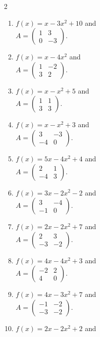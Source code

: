 \begin{multicols}{2}
\begin{enumerate}[label=\arabic*.,  leftmargin=*]
\item $f(x) = x - 3x^2 + 10$ and \\
$A = \begin{pmatrix} 1 & 3 \\ 0 & -3 \end{pmatrix}$.
\item $f(x) = x - 4x^2$ and \\
$A = \begin{pmatrix} 1 & -2 \\ 3 & 2 \end{pmatrix}$.
\item $f(x) = x - x^2 + 5$ and \\
$A = \begin{pmatrix} 1 & 1 \\ 3 & 3 \end{pmatrix}$.
\item $f(x) = x - x^2 + 3$ and \\
$A = \begin{pmatrix} 3 & -3 \\ -4 & 0 \end{pmatrix}$.
\item $f(x) = 5x - 4x^2 + 4$ and \\
$A = \begin{pmatrix} 2 & 1 \\ -4 & 3 \end{pmatrix}$.
\item $f(x) = 3x - 2x^2 - 2$ and \\
$A = \begin{pmatrix} 3 & -4 \\ -1 & 0 \end{pmatrix}$.
\item $f(x) = 2x - 2x^2 + 7$ and \\
$A = \begin{pmatrix} 2 & 3 \\ -3 & -2 \end{pmatrix}$.
\item $f(x) = 4x - 4x^2 + 3$ and \\
$A = \begin{pmatrix} -2 & 2 \\ 4 & 0 \end{pmatrix}$.
\item $f(x) = 4x - 3x^2 + 7$ and \\
$A = \begin{pmatrix} -1 & -2 \\ -3 & -2 \end{pmatrix}$.
\item $f(x) = 2x - 2x^2 + 2$ and \\

\end{enumerate}
\end{multicols}
